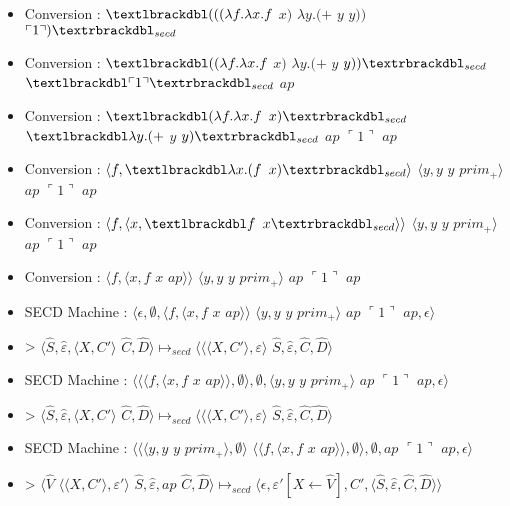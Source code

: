 \documentclass[10pt,a4paper]{article}
\begin{document}
				\begin{itemize}
					\item[] Conversion : $\textlbrackdbl(((\lambda f.\lambda x.f$ $x)$ $\lambda y.(+$ $y$ $y))$ $\ulcorner 1\urcorner)\textrbrackdbl_{secd}$
					\item[] Conversion : $\textlbrackdbl((\lambda f.\lambda x.f$ $x)$ $\lambda y.(+$ $y$ $y))\textrbrackdbl_{secd}$ $\textlbrackdbl\ulcorner 1\urcorner\textrbrackdbl_{secd}$ $ap$
					\item[] Conversion : $\textlbrackdbl(\lambda f.\lambda x.f$ $x)\textrbrackdbl_{secd}$ $\textlbrackdbl\lambda y.(+$ $y$ $y)\textrbrackdbl_{secd}$ $ap$ $\ulcorner 1\urcorner$ $ap$
					\item[] Conversion : $\langle f,\textlbrackdbl\lambda x.(f$ $x)\textrbrackdbl_{secd}\rangle$ $\langle y,y$ $y$ $prim_{+}\rangle$ $ap$ $\ulcorner 1\urcorner$ $ap$
					\item[] Conversion : $\langle f,\langle x,\textlbrackdbl f$ $x\textrbrackdbl_{secd}\rangle\rangle$ $\langle y,y$ $y$ $prim_{+}\rangle$ $ap$ $\ulcorner 1\urcorner$ $ap$
					\item[] Conversion : $\langle f,\langle x,f$ $x$ $ap\rangle\rangle$ $\langle y,y$ $y$ $prim_{+}\rangle$ $ap$ $\ulcorner 1\urcorner$ $ap$
					\item[] SECD Machine : $\langle\epsilon,\emptyset,\langle f,\langle x,f$ $x$ $ap\rangle\rangle$ $\langle y,y$ $y$ $prim_{+}\rangle$ $ap$ $\ulcorner 1\urcorner$ $ap,\epsilon\rangle$ 
					\item[] > $\langle\widehat{S},\widehat{\varepsilon},\langle X,C'\rangle$ $\widehat{C},\widehat{D}\rangle \longmapsto_{secd} \langle\langle\langle X,C'\rangle,\varepsilon\rangle$ $\widehat{S},\widehat{\varepsilon},\widehat{C},\widehat{D}\rangle$
					\item[] SECD Machine : $\langle\langle\langle f,\langle x,f$ $x$ $ap\rangle\rangle,\emptyset\rangle,\emptyset,\langle y,y$ $y$ $prim_{+}\rangle$ $ap$ $\ulcorner 1\urcorner$ $ap,\epsilon\rangle$ 
					\item[] > $\langle\widehat{S},\widehat{\varepsilon},\langle X,C'\rangle$ $\widehat{C},\widehat{D}\rangle \longmapsto_{secd} \langle\langle\langle X,C'\rangle,\varepsilon\rangle$ $\widehat{S},\widehat{\varepsilon},\widehat{C}\widehat{,D}\rangle$
					\item[] SECD Machine : $\langle\langle\langle y,y$ $y$ $prim_{+}\rangle,\emptyset\rangle$ $\langle\langle f,\langle x,f$ $x$ $ap\rangle\rangle,\emptyset\rangle,\emptyset,ap$ $\ulcorner 1\urcorner$ $ap,\epsilon\rangle$
					\item[] > $\langle\widehat{V}$ $\langle\langle X,C'\rangle,\varepsilon'\rangle$ $\widehat{S},\widehat{\varepsilon},ap$ $\widehat{C},\widehat{D}\rangle \longmapsto_{secd} \langle\epsilon,\varepsilon'[X \leftarrow \widehat{V}],C',\langle\widehat{S},\widehat{\varepsilon},\widehat{C},\widehat{D}\rangle\rangle$

\end{itemize}
\end{document}
